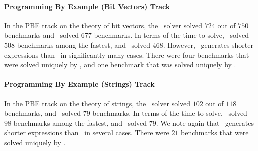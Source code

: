 \paragraph{Programming By Example (Bit Vectors) Track}
In the PBE track on the theory of bit vectors, the \cvcnew\ solver solved $724$ out of $750$ benchmarks
and \eusolvernew\ solved $677$ benchmarks.
In terms of the time to solve, \cvcnew\ solved $508$ benchmarks among the fastest,
and \eusolvernew\ solved $468$.
However, \eusolvernew\ generates shorter expressions than \cvcnew\ in significantly many cases.
There were four benchmarks that were solved uniquely by \cvcnew,
and one benchmark that was solved uniquely by \eusolvernew.
\vspace{-0.5em}
\paragraph{Programming By Example (Strings) Track}
In the PBE track on the theory of strings, the \cvcnew\ solver solved $102$ out of $118$ benchmarks,
and \eusolvernew\ solved $79$ benchmarks.
In terms of the time to solve, \cvcnew\ solved $98$ benchmarks among the fastest,
and \eusolvernew\ solved $79$.
We note again that \eusolvernew\ generates shorter expressions than \cvcnew\ in several cases.
There were $21$ benchmarks that were solved uniquely by \cvcnew.
